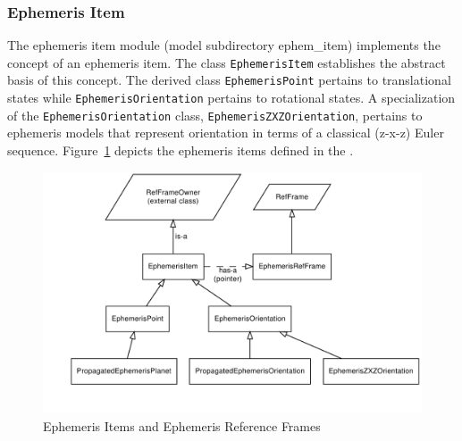 \subsubsection{Ephemeris Item}
The ephemeris item module (model subdirectory ephem\_item)
implements the concept of an ephemeris item.
The class \texttt{EphemerisItem} establishes the abstract basis of this concept.
The derived class \texttt{EphemerisPoint} pertains to translational states
while \texttt{EphemerisOrientation} pertains to rotational states.
A specialization of the \texttt{EphemerisOrientation} class,
\texttt{EphemerisZXZOrientation}, pertains to ephemeris models that represent
orientation in terms of a classical (z-x-z) Euler sequence.
Figure~\ref{fig:ephem_item_classes} depicts the ephemeris items
defined in the \ModelDesc.
\begin{figure}[hbtp]
\centering
\includegraphics{ephem_item}
\caption{Ephemeris Items and Ephemeris Reference Frames}
\label{fig:ephem_item_classes}
\end{figure}

